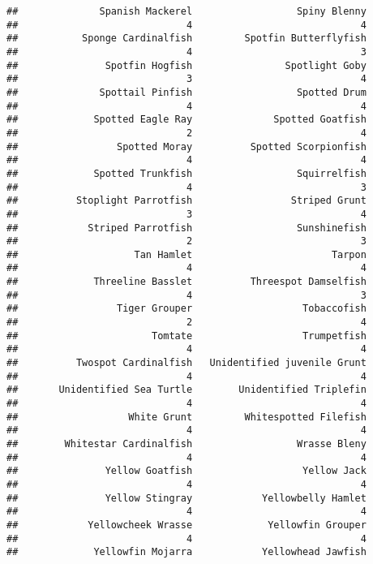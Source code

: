 \documentclass[
]{article}
\begin{document}
\begin{verbatim}
##              Spanish Mackerel                  Spiny Blenny 
##                             4                             4 
##           Sponge Cardinalfish         Spotfin Butterflyfish 
##                             4                             3 
##               Spotfin Hogfish                Spotlight Goby 
##                             3                             4 
##              Spottail Pinfish                  Spotted Drum 
##                             4                             4 
##             Spotted Eagle Ray              Spotted Goatfish 
##                             2                             4 
##                 Spotted Moray          Spotted Scorpionfish 
##                             4                             4 
##             Spotted Trunkfish                  Squirrelfish 
##                             4                             3 
##          Stoplight Parrotfish                 Striped Grunt 
##                             3                             4 
##            Striped Parrotfish                  Sunshinefish 
##                             2                             3 
##                    Tan Hamlet                        Tarpon 
##                             4                             4 
##             Threeline Basslet          Threespot Damselfish 
##                             4                             3 
##                 Tiger Grouper                   Tobaccofish 
##                             2                             4 
##                       Tomtate                   Trumpetfish 
##                             4                             4 
##          Twospot Cardinalfish   Unidentified juvenile Grunt 
##                             4                             4 
##       Unidentified Sea Turtle        Unidentified Triplefin 
##                             4                             4 
##                   White Grunt         Whitespotted Filefish 
##                             4                             4 
##        Whitestar Cardinalfish                  Wrasse Bleny 
##                             4                             4 
##               Yellow Goatfish                   Yellow Jack 
##                             4                             4 
##               Yellow Stingray            Yellowbelly Hamlet 
##                             4                             4 
##            Yellowcheek Wrasse             Yellowfin Grouper 
##                             4                             4 
##             Yellowfin Mojarra            Yellowhead Jawfish 

\end{verbatim}
\end{document}
